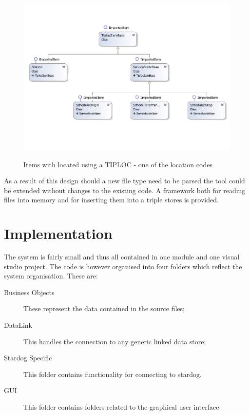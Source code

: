  \begin{figure}[!h]
\myfloatalign
{\includegraphics[width=\linewidth]{gfx/ItemsWithTIPLOCsResized}} 
\caption{Items with located using a TIPLOC - one of the location codes}
\label{fig:tiplocedItems}
\end{figure}


 As a result of this design should a new file type need to be parsed the tool could be extended without changes to the existing code. A framework both for reading files into memory and for inserting them into a triple stores is provided.
 \section{Implementation}  
 The system is fairly small and thus all contained in one module and one visual studio project. The code is however organised into four folders which reflect the system organisation. These are:
 \begin{description}
 	\item[Business Objects] These represent the data contained in the source files;
 	\item[DataLink] This handles the connection to any generic linked data store;
 	\item[Stardog Specific] This folder contains functionality for connecting to stardog.
 	\item[GUI] This folder contains folders related to the graphical user interface
 \end{description}

